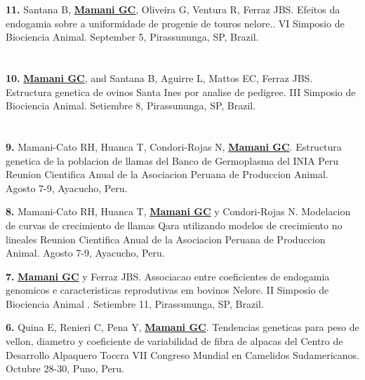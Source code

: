 \documentclass[margin,line,10pt]{res}
\newenvironment{list1}{
  \begin{list}{\ding{113}}{%
      \setlength{\itemsep}{0in}
      \setlength{\parsep}{0in} \setlength{\parskip}{0in}
      \setlength{\topsep}{0in} \setlength{\partopsep}{0in} 
      \setlength{\leftmargin}{0.17in}}}{\end{list}}
\begin{document}
\begin{resume}
\begin{list1}
\item [\bf{11}.] Santana B, {\bf \underline{Mamani GC}}, Oliveira G,  Ventura R, Ferraz JBS. 
Efeitos da endogamia sobre a uniformidade de progenie de touros nelore..
VI Simposio de Biociencia Animal. September 5, Pirassununga, SP, Brazil. 
\end{list1}

\section{}
\begin{list1}
\item [\bf{10}.] {\bf \underline{Mamani GC}}, and Santana B, Aguirre L, Mattos EC, Ferraz JBS. 
Estructura genetica de ovinos Santa Ines por analise de pedigree.
III Simposio de Biociencia Animal. Setiembre 8, Pirassununga, SP, Brazil. 
\end{list1}

\section{}
\begin{list1}
\item [\bf{9}.] Mamani-Cato RH, Huanca T, Condori-Rojas N, {\bf \underline{Mamani GC}}.
Estructura genetica de la poblacion de llamas del Banco de Germoplasma del INIA Peru
Reunion Cientifica Anual de la Asociacion Peruana de Produccion Animal. Agosto 7-9, Ayacucho, Peru. 
\vspace{0.5cm}

\item [\bf{8}.] Mamani-Cato RH, Huanca T, {\bf \underline{Mamani GC}} y Condori-Rojas N.
Modelacion de curvas de crecimiento de llamas Qara utilizando modelos de crecimiento no lineales
Reunion Cientifica Anual de la Asociacion Peruana de Produccion Animal. Agosto 7-9, Ayacucho, Peru. 
\vspace{0.5cm}

\item [\bf{7}.] {\bf \underline{Mamani GC}} y Ferraz JBS. 
Associacao entre coeficientes de endogamia genomicos e caracteristicas reprodutivas em bovinos Nelore.
II Simposio de Biociencia Animal . Setiembre 11, Pirassununga, SP, Brazil. 
\vspace{0.5cm}

\item [\bf{6}.] Quina E, Renieri C, Pena Y, {\bf \underline{Mamani GC}}.
Tendencias geneticas para peso de vellon, diametro y coeficiente de variabilidad de fibra de alpacas del Centro de Desarrollo Alpaquero Toccra
VII Congreso Mundial en Camelidos Sudamericanos. Octubre 28-30, Puno, Peru. 
\vspace{0.5cm}


\end{list1}
\end{resume}
\end{document}
